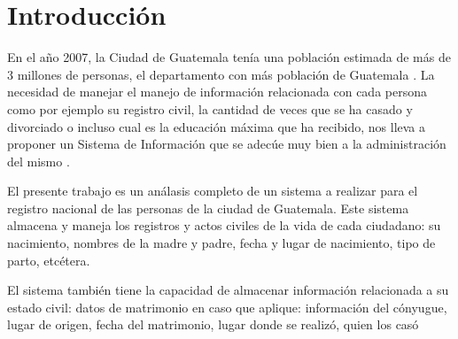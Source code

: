 \chapter*{Introducci\'{o}n}

En el a\~{n}o 2007, la Ciudad de Guatemala ten\'{i}a una poblaci\'{o}n estimada de m\'{a}s de 3 millones de personas, el departamento con m\'{a}s poblaci\'{o}n de Guatemala  \cite{WolframAlpha-PoblacionGuatemala2007}. La necesidad de manejar el manejo de informaci\'{o}n relacionada con cada persona como por ejemplo su registro civil, la cantidad de veces que se ha casado y divorciado o incluso cual es la educaci\'{o}n m\'{a}xima que ha recibido, nos lleva a proponer un Sistema de Informaci\'{o}n que se adec\'{u}e muy bien a la administraci\'{o}n del mismo .

El presente trabajo es un an\'{a}lasis completo de un sistema a realizar para el registro nacional de las personas de la ciudad de Guatemala. Este sistema almacena y maneja los registros y actos civiles de la vida de cada ciudadano: su nacimiento, nombres de la madre y padre, fecha y lugar de nacimiento, tipo de parto, etc\'{e}tera. 

El sistema tambi\'{e}n tiene la capacidad de almacenar informaci\'{o}n relacionada a su estado civil: datos de matrimonio en caso que aplique: informaci\'{o}n del c\'{o}nyugue, lugar de origen, fecha del matrimonio, lugar donde se realiz\'{o}, quien los cas\'{o} 
